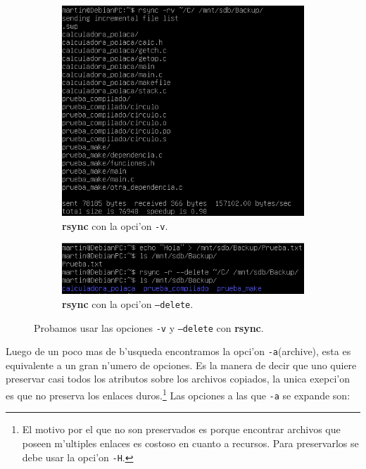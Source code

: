 \documentclass[11pt]{article}
\newcommand{\rsync}[0]{\textbf{rsync}}
\begin{document}
		\begin{figure}[h]
			\centering
			\begin{subfigure}{0.75\linewidth}
				\includegraphics[width=1\linewidth]{Images/rsync/rsync_backup_verbose.PNG}
				\caption{\rsync{} con la opci'on \texttt{-v}.}
			\end{subfigure}
			\bigbreak
			\begin{subfigure}{0.7\linewidth}
				\includegraphics[width=1\linewidth]{Images/rsync/rsync_backup_delete.PNG}
				\caption{\rsync{} con la opci'on \texttt{--delete}.}
			\end{subfigure}
			\caption{Probamos usar las opciones \texttt{-v} y \texttt{--delete} con \rsync{}.}
			\label{fig:rsync_backup_options_1}
		\end{figure}

		Luego de un poco mas de b'usqueda encontramos la opci'on \texttt{-a}(archive), esta es equivalente a un gran n'umero de opciones. Es la manera de decir que uno quiere preservar casi todos los atributos sobre los archivos copiados, la unica exepci'on es que no preserva los enlaces duros.\footnote{El motivo por el que no son preservados es porque encontrar archivos que poseen m'ultiples enlaces es costoso en cuanto a recursos. Para preservarlos se debe usar la opci'on \texttt{-H}.} Las opciones a las que \texttt{-a} se expande son:
\end{document}
